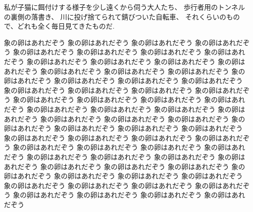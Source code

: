 私が子猫に餌付けする様子を少し遠くから伺う大人たち、
歩行者用のトンネルの裏側の落書き、
川に投げ捨てられて錆びついた自転車、
それくらいのもので、どれも全く毎日見てきたものだ.

象の卵はあれだぞう 象の卵はあれだぞう 象の卵はあれだぞう 象の卵はあれだぞう 象の卵はあれだぞう
象の卵はあれだぞう 象の卵はあれだぞう 象の卵はあれだぞう 象の卵はあれだぞう 象の卵はあれだぞう
象の卵はあれだぞう 象の卵はあれだぞう 象の卵はあれだぞう 象の卵はあれだぞう 象の卵はあれだぞう
象の卵はあれだぞう 象の卵はあれだぞう 象の卵はあれだぞう 象の卵はあれだぞう 象の卵はあれだぞう
象の卵はあれだぞう 象の卵はあれだぞう 象の卵はあれだぞう 象の卵はあれだぞう 象の卵はあれだぞう
象の卵はあれだぞう 象の卵はあれだぞう 象の卵はあれだぞう 象の卵はあれだぞう 象の卵はあれだぞう
象の卵はあれだぞう 象の卵はあれだぞう 象の卵はあれだぞう 象の卵はあれだぞう 象の卵はあれだぞう
象の卵はあれだぞう 象の卵はあれだぞう 象の卵はあれだぞう 象の卵はあれだぞう 象の卵はあれだぞう
象の卵はあれだぞう 象の卵はあれだぞう 象の卵はあれだぞう 象の卵はあれだぞう 象の卵はあれだぞう
象の卵はあれだぞう 象の卵はあれだぞう 象の卵はあれだぞう 象の卵はあれだぞう 象の卵はあれだぞう
象の卵はあれだぞう 象の卵はあれだぞう 象の卵はあれだぞう 象の卵はあれだぞう 象の卵はあれだぞう
象の卵はあれだぞう 象の卵はあれだぞう 象の卵はあれだぞう 象の卵はあれだぞう 象の卵はあれだぞう
象の卵はあれだぞう 象の卵はあれだぞう 象の卵はあれだぞう 象の卵はあれだぞう 象の卵はあれだぞう
